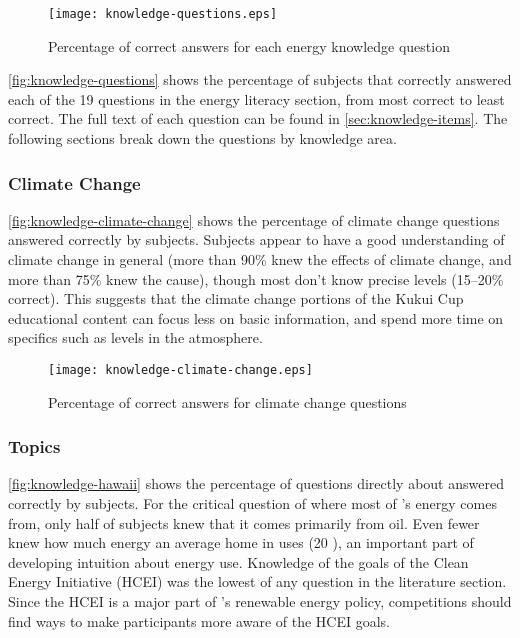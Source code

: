 \begin{figure}[htbp]
	\centering
		\texttt{[image: knowledge-questions.eps]}
		\caption[Plot of energy knowledge before and after competition]{Percentage of correct answers for each energy knowledge question}
\label{fig:knowledge-questions}
\end{figure}

\autoref{fig:knowledge-questions} shows the percentage of subjects that correctly answered each of the 19 questions in the energy literacy section, from most correct to least correct. The full text of each question can be found in \autoref{sec:knowledge-items}. The following sections break down the questions by knowledge area.


\subsubsection{Climate Change}

\autoref{fig:knowledge-climate-change} shows the percentage of climate change questions answered correctly by subjects. Subjects appear to have a good understanding of climate change in general (more than 90\% knew the effects of climate change, and more than 75\% knew the cause), though most don't know precise \COtwo levels (15--20\% correct). This suggests that the climate change portions of the Kukui Cup educational content can focus less on basic information, and spend more time on specifics such as \COtwo levels in the atmosphere.

\begin{figure}[htbp]
	\centering
		\texttt{[image: knowledge-climate-change.eps]}
		\caption{Percentage of correct answers for climate change questions}
\label{fig:knowledge-climate-change}
\end{figure}


\subsubsection{\Hawaii Topics}

\autoref{fig:knowledge-hawaii} shows the percentage of questions directly about \Hawaii answered correctly by subjects. For the critical question of where most of \Hawaii's energy comes from, only half of subjects knew that it comes primarily from oil. Even fewer knew how much energy an average home in \Hawaii uses (20 \kWh), an important part of developing intuition about energy use. Knowledge of the goals of the \Hawaii Clean Energy Initiative (HCEI) was the lowest of any question in the literature section. Since the HCEI is a major part of \Hawaii's renewable energy policy, competitions should find ways to make participants more aware of the HCEI goals.

